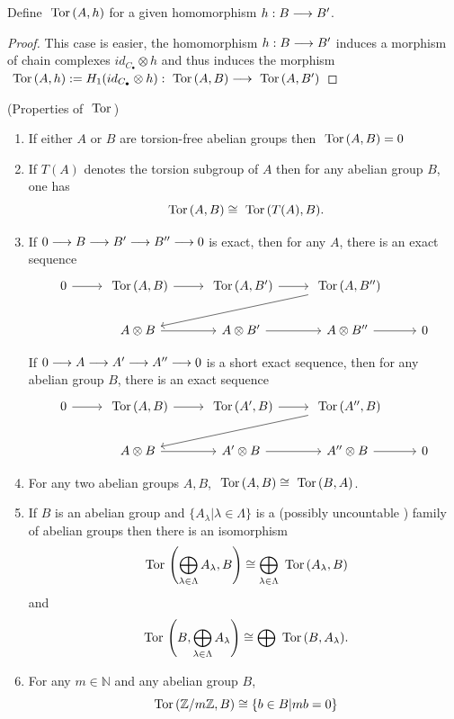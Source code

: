 \documentclass[11pt]{book} %
\begin{document}
\begin{exr}
Define $\text{ Tor\,}(A,h)$ for a given homomorphism $h: B\longrightarrow B'$.
\end{exr}
\begin{proof}
This case is easier, the homomorphism $h: B\longrightarrow B'$ induces a morphism of chain complexes $id_{C_\bullet}\otimes h$ and thus induces the morphism $\text{ Tor\,}(A,h):=H_1(id_{C_\bullet}\otimes h):\text{ Tor\,}(A,B)\longrightarrow \text{ Tor\,}(A,B')$
\end{proof}
\begin{theorem}
(Properties of $\text{ Tor\,}$)
\begin{enumerate}[label=(\arabic*)]
\item If either $A$ or $B$ are torsion-free abelian groups then $\text{ Tor\,}(A,B)=0$
\item If $T(A)$ denotes the torsion subgroup of $A$ then for any abelian group $B$, one has 
$$
\text{ Tor\,}(A,B)\cong \text{ Tor\,}(T(A),B).
$$
\item 
If $0\longrightarrow B\longrightarrow B'\longrightarrow B''\longrightarrow 0$ is exact, then for any $A$, there is an exact sequence
$$
\begin{tikzcd}
0 \arrow[r] & \tor(A,B) \arrow[r] & \tor(A,B') \arrow[r] & \tor(A,B'') \arrow[lld] &  \\
 & A\otimes B \arrow[r] & A\otimes B' \arrow[r] & A\otimes B'' \arrow[r] & 0
\end{tikzcd}
$$

If $0\longrightarrow A\longrightarrow A'\longrightarrow A''\longrightarrow 0$ is a short exact sequence, then for any abelian group $B$, there is an exact sequence
$$
\begin{tikzcd}
0 \arrow[r] & \tor(A,B) \arrow[r] & \tor(A',B) \arrow[r] & \tor(A'',B) \arrow[lld] &  \\
 & A\otimes B \arrow[r] & A'\otimes B \arrow[r] & A''\otimes B \arrow[r] & 0
\end{tikzcd}
$$
\item For any two abelian groups $A,B$, $\text{ Tor\,}(A,B)\cong \text{ Tor\,}(B, A)$.
\item If $B$ is an abelian group and $\{A_\lambda|\lambda\in \Lambda\}$ is a (possibly uncountable ) family of abelian groups then there is an isomorphism
$$
\text{ Tor\,}\left(\bigoplus_{\lambda\in\Lambda}A_\lambda, B\right)\cong \bigoplus_{\lambda\in\Lambda}\text{ Tor\,}(A_\lambda, B)
$$
and 
$$
\text{ Tor\,}\left(B,\bigoplus_{\lambda\in \Lambda}A_\lambda\right)\cong\bigoplus \text{ Tor\,}(B,A_\lambda).
$$
\item For any $m\in \mathbb{N}$ and any abelian group $B$,
$$
\text{ Tor\,}(\mathbb Z/m\mathbb Z, B)\cong \{b\in B| mb=0\}
$$
\end{enumerate}
\end{theorem}
\end{document}
